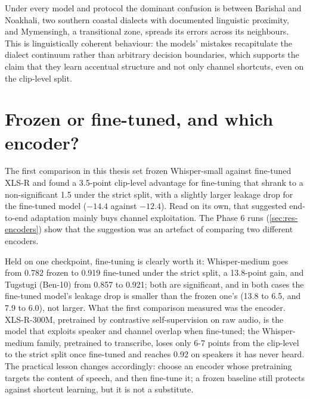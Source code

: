 Under every model and protocol the dominant confusion is between Barishal and
Noakhali, two southern coastal dialects with documented linguistic proximity,
and Mymensingh, a transitional zone, spreads its errors across its neighbours.
This is linguistically coherent behaviour: the models' mistakes recapitulate the
dialect continuum rather than arbitrary decision boundaries, which supports the
claim that they learn accentual structure and not only channel shortcuts, even
on the clip-level split.

\section{Frozen or fine-tuned, and which encoder?}
\label{sec:disc-finetune}

The first comparison in this thesis set frozen Whisper-small against
fine-tuned XLS-R and found a 3.5-point clip-level advantage for fine-tuning
that shrank to a non-significant 1.5 under the strict split, with a slightly
larger leakage drop for the fine-tuned model ($-14.4$ against $-12.4$). Read
on its own, that suggested end-to-end adaptation mainly buys channel
exploitation. The Phase 6 runs (\cref{sec:res-encoders}) show that the
suggestion was an artefact of comparing two different encoders.

Held on one checkpoint, fine-tuning is clearly worth it: Whisper-medium goes
from 0.782 frozen to 0.919 fine-tuned under the strict split, a 13.8-point
gain, and Tugstugi (Ben-10) from 0.857 to 0.921; both are significant, and in
both cases the fine-tuned model's leakage drop is smaller than the frozen
one's (13.8 to 6.5, and 7.9 to 6.0), not larger. What the first comparison
measured was the encoder. XLS-R-300M, pretrained by contrastive
self-supervision on raw audio, is the model that exploits speaker and channel
overlap when fine-tuned; the Whisper-medium family, pretrained to transcribe,
loses only 6-7 points from the clip-level to the strict split once fine-tuned
and reaches 0.92 on speakers it has never heard. The practical lesson changes
accordingly: choose an encoder whose pretraining targets the content of
speech, and then fine-tune it; a frozen baseline still protects against
shortcut learning, but it is not a substitute.

